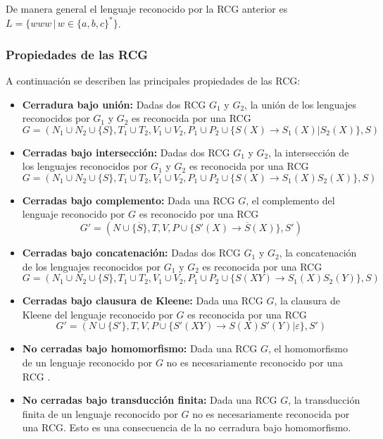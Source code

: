\documentclass{article}
\begin{document}
De manera general el lenguaje reconocido por la RCG anterior es $L=\{www\,|\,w\in \{a,b,c\}^*\}$.

\subsubsection{Propiedades de las RCG}

A continuación se describen las principales propiedades de las RCG:
\begin{itemize}
      \item \textbf{Cerradura bajo unión:} Dadas dos RCG $G_1$ y $G_2$, la unión de los lenguajes reconocidos por $G_1$ y $G_2$ es reconocida por una RCG
            $$G=(N_1\cup N_2\cup \{S\},T_1\cup T_2,V_1\cup V_2,P_1\cup P_2\cup \{S(X)\to S_1(X)|S_2(X)\},S)$$
      \item \textbf{Cerradas bajo intersección:} Dadas dos RCG $G_1$ y $G_2$, la intersección de los lenguajes reconocidos por $G_1$ y $G_2$ es reconocida por una RCG
            $$G=(N_1\cup N_2\cup \{S\},T_1\cup T_2,V_1\cup V_2,P_1\cup P_2\cup \{S(X)\to S_1(X)S_2(X)\},S)$$
      \item \textbf{Cerradas bajo complemento:} Dada una RCG $G$, el complemento del lenguaje reconocido por $G$ es reconocido por una RCG
            $$G'=(N\cup \{\overline{S}\},T,V,P\cup \{S'(X)\to \overline{S}(X)\},S')$$
      \item \textbf{Cerradas bajo concatenación:} Dadas dos RCG $G_1$ y $G_2$, la concatenación de los lenguajes reconocidos por $G_1$ y $G_2$ es reconocida por una RCG
            $$G=(N_1\cup N_2\cup \{S\},T_1\cup T_2,V_1\cup V_2,P_1\cup P_2\cup \{S(XY)\to S_1(X)S_2(Y)\},S)$$
      \item \textbf{Cerradas bajo clausura de Kleene:} Dada una RCG $G$, la clausura de Kleene del lenguaje reconocido por $G$ es reconocida por una RCG
            $$G'=(N\cup \{S'\},T,V,P\cup \{S'(XY)\to S(X)S'(Y)|\varepsilon\},S')$$
      \item  \textbf{No cerradas bajo homomorfismo:} Dada una RCG $G$, el homomorfismo de un lenguaje reconocido por $G$ no es necesariamente reconocido por una RCG \cite{propertiesRCGBib}.
      \item  \textbf{No cerradas bajo transducción finita:} Dada una RCG $G$, la transducción finita de un lenguaje reconocido por $G$ no es necesariamente reconocida por una RCG.
            Esto es una consecuencia de la no cerradura bajo homomorfismo.
\end{itemize}
\end{document}
